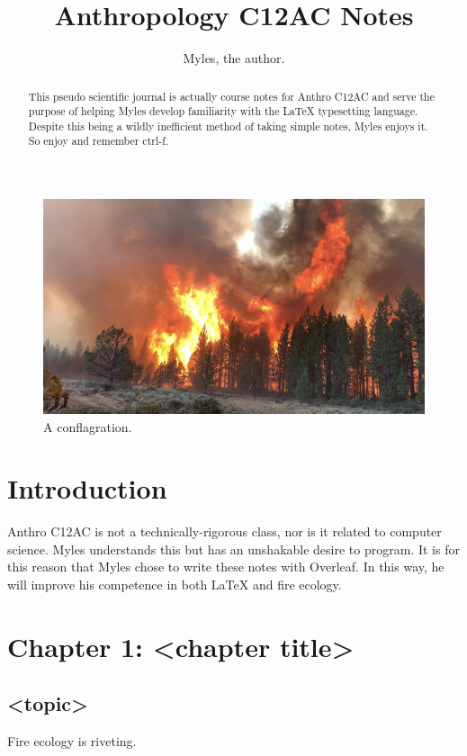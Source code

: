 \documentclass[a4paper]{article}
\title{Anthropology C12AC Notes}
\author{Myles, the author.}
\begin{document}
\begin{figure}
\centering
\includegraphics[width=1\textwidth]{conflagration.jpeg}
\caption{\label{fig:conflagration}A conflagration.}
\end{figure}

\maketitle

\begin{abstract}
This pseudo scientific journal is actually course notes for Anthro C12AC and serve the purpose of helping Myles develop familiarity with the LaTeX typesetting language. Despite this being a wildly inefficient method of taking simple notes, Myles enjoys it. So enjoy and remember ctrl-f.
\end{abstract}

\section{Introduction}

Anthro C12AC is not a technically-rigorous class, nor is it related to computer science. Myles understands this but has an unshakable desire to program. It is for this reason that Myles chose to write these notes with Overleaf. In this way, he will improve his competence in both LaTeX and fire ecology.


\section{Chapter 1: <chapter title>}

\subsection{<topic>}
Fire ecology is riveting.
\end{document}

